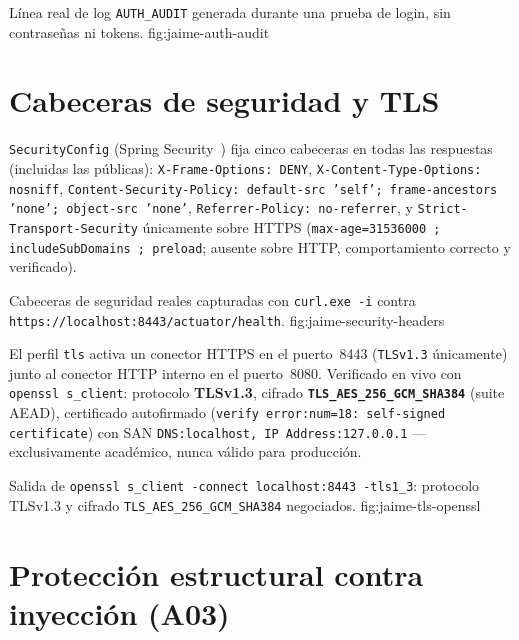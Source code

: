 %
{L\'inea real de log \texttt{AUTH\_AUDIT} generada durante una prueba de login, sin contrase\~nas ni tokens.}%
{fig:jaime-auth-audit}

\section{Cabeceras de seguridad y TLS}

\texttt{SecurityConfig} (Spring Security~\cite{spring-security-docs}) fija cinco cabeceras en todas las respuestas
(incluidas las p\'ublicas): \texttt{X-Frame-Options: DENY},
\texttt{X-Content-Type-Options: nosniff}, \texttt{Content-Security-Policy:
default-src 'self'; frame-ancestors 'none'; object-src 'none'},
\texttt{Referrer-Policy: no-referrer}, y
\texttt{Strict-Transport-Security} \'unicamente sobre HTTPS
(\texttt{max-age=31536000 ; includeSubDomains ; preload}; ausente sobre
HTTP, comportamiento correcto y verificado).

%
{Cabeceras de seguridad reales capturadas con \texttt{curl.exe -i} contra \texttt{https://localhost:8443/actuator/health}.}%
{fig:jaime-security-headers}

El perfil \texttt{tls} activa un conector HTTPS en el puerto~8443
(\texttt{TLSv1.3} \'unicamente) junto al conector HTTP interno en el
puerto~8080. Verificado en vivo con \texttt{openssl s\_client}: protocolo
\textbf{TLSv1.3}, cifrado \textbf{\texttt{TLS\_AES\_256\_GCM\_SHA384}}
(suite AEAD), certificado autofirmado (\texttt{verify error:num=18:
self-signed certificate}) con SAN \texttt{DNS:localhost,
IP Address:127.0.0.1} --- exclusivamente acad\'emico, nunca v\'alido para
producci\'on.

%
{Salida de \texttt{openssl s\_client -connect localhost:8443 -tls1\_3}: protocolo TLSv1.3 y cifrado \texttt{TLS\_AES\_256\_GCM\_SHA384} negociados.}%
{fig:jaime-tls-openssl}

\section{Protecci\'on estructural contra inyecci\'on (A03)}

